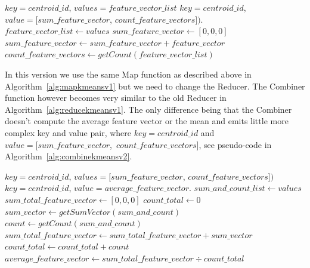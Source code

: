 \begin{center}
\newcommand{\map}{\ensuremath{\mbox{\sc Kmeans version 2: Combine}}}
\begin{algorithm}[h!]
\caption{$\map(key,value)$}\label{alg:combinekmeansv2}
\begin{algorithmic}[1]
\REQUIRE $key = centroid\_id$, $values = feature\_vector\_list$
\ENSURE $key = centroid\_id$, $value = [sum\_feature\_vector$, $count\_feature\_vectors])$.
\STATE $feature\_vector\_list \leftarrow values$
\medskip
\STATE $sum\_feature\_vector \leftarrow [0, 0, 0]$
	\STATE $sum\_feature\_vector \leftarrow sum\_feature\_vector + feature\_vector$
\ENDFOR
\medskip
\STATE $count\_feature\_vectors \leftarrow getCount(feature\_vector\_list)$
\medskip
{}
\end{algorithmic}
\end{algorithm}
\end{center}

In this version we use the same Map function as described above in Algorithm~\ref{alg:mapkmeansv1} but we need to change the Reducer. The Combiner function however becomes very similar to the old Reducer in Algorithm~\ref{alg:reducekmeansv1}. The only difference being that the Combiner doesn't compute the average feature vector or the mean and emits little more complex key and value pair, where $key = centroid\_id$ and $value = [sum\_feature\_vector$,~$count\_feature\_vectors]$, see pseudo-code in Algorithm~\ref{alg:combinekmeansv2}. 
\begin{center}
\newcommand{\map}{\ensuremath{\mbox{\sc Kmeans version 2: Reduce}}}
\begin{algorithm}[h!]
\caption{$\map(key,value)$}\label{alg:reducekmeansv2}
\begin{algorithmic}[1]
\REQUIRE $key = centroid\_id$, $values = [sum\_feature\_vector$, $count\_feature\_vectors])$
\ENSURE $key = centroid\_id$, $value = average\_feature\_vector$.
\STATE $sum\_and\_count\_list \leftarrow values$
\medskip
\STATE $sum\_total\_feature\_vector \leftarrow [0, 0, 0]$
\STATE $count\_total \leftarrow 0$
	\STATE $sum\_vector \leftarrow getSumVector(sum\_and\_count)$
	\STATE $count \leftarrow getCount(sum\_and\_count)$
	\STATE $sum\_total\_feature\_vector \leftarrow sum\_total\_feature\_vector + sum\_vector$
	\STATE $count\_total \leftarrow count\_total + count$
\ENDFOR
\medskip
\STATE $average\_feature\_vector \leftarrow sum\_total\_feature\_vector \div count\_total$
\medskip
{}
\end{algorithmic}
\end{algorithm}
\end{center}


